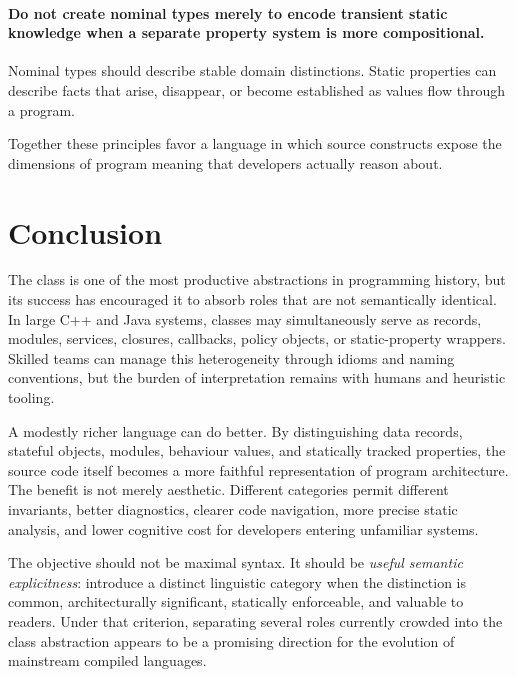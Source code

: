 \documentclass[11pt]{article}
\begin{document}
\paragraph{Do not create nominal types merely to encode transient static knowledge when a separate property system is more compositional.}
Nominal types should describe stable domain distinctions. Static properties can describe facts that arise, disappear, or become established as values flow through a program.

Together these principles favor a language in which source constructs expose the dimensions of program meaning that developers actually reason about.

\section{Conclusion}

The class is one of the most productive abstractions in programming history, but its success has encouraged it to absorb roles that are not semantically identical. In large C++ and Java systems, classes may simultaneously serve as records, modules, services, closures, callbacks, policy objects, or static-property wrappers. Skilled teams can manage this heterogeneity through idioms and naming conventions, but the burden of interpretation remains with humans and heuristic tooling.

A modestly richer language can do better. By distinguishing data records, stateful objects, modules, behaviour values, and statically tracked properties, the source code itself becomes a more faithful representation of program architecture. The benefit is not merely aesthetic. Different categories permit different invariants, better diagnostics, clearer code navigation, more precise static analysis, and lower cognitive cost for developers entering unfamiliar systems.

The objective should not be maximal syntax. It should be \emph{useful semantic explicitness}: introduce a distinct linguistic category when the distinction is common, architecturally significant, statically enforceable, and valuable to readers. Under that criterion, separating several roles currently crowded into the class abstraction appears to be a promising direction for the evolution of mainstream compiled languages.
\end{document}
